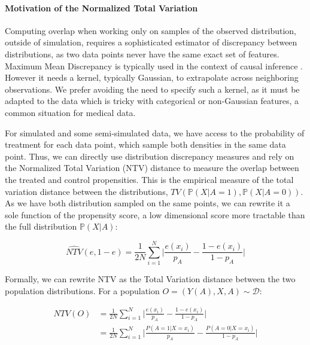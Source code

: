 \documentclass[french,12pt,twoside,a4paper]{book}
\begin{document}
\begin{appendices}
  \paragraph{Motivation of the Normalized Total Variation}
  Computing overlap when working only on samples of the observed distribution,
  outside of simulation, requires a sophisticated estimator of discrepancy
  between distributions, as two data points never have the same exact set of
  features. Maximum Mean Discrepancy \citep{gretton2012kernel} is typically
  used in the context of causal inference
  \citep{shalit_estimating_2017,johansson2022generalization}. However it
  needs a kernel, typically Gaussian, to extrapolate across neighboring
  observations. We prefer avoiding the need to specify such a kernel, as it must
  be adapted to the data which is tricky with categorical or non-Gaussian
  features, a common situation for medical data.

  For simulated and some semi-simulated data, we have access to the probability of
  treatment for each data point, which sample both densities in the same data
  point. Thus, we can directly use distribution discrepancy measures and rely on
  the Normalized Total Variation (NTV) distance to measure the overlap between the
  treated and control propensities. This is the empirical measure of the total
  variation distance \citep{sriperumbudur_integral_2009} between the distributions,
  $TV(\mathbb{P}(X|A=1), \mathbb{P}(X|A=0))$. As we have both distribution sampled
  on the same points, we can rewrite it a sole function of the propensity score, a
  low dimensional score more tractable than the full distribution $\mathbb
    P(X|A)$:

  \begin{equation}\label{eq:ntv}
    \widehat{NTV}(e, 1-e) = \frac{1}{2N} \sum_{i =1}^{N} \big |\frac{e(x_i)}{p_A}-\frac{1-e(x_i)}{1-{p_A}} \big |
  \end{equation}

  Formally, we can rewrite NTV as the Total Variation distance
  between the two population distributions. For a population $O = (Y(A), X, A)
    \sim \mathcal{D}$:

  \begin{align*}
    NTV(O) & = \frac{1}{2N} \sum_{i =1}^{N} \big | \frac{e(x_i)}{p_A}-\frac{1-e(x_i)}{1-{p_A}} \big|         \\
           & = \frac{1}{2N} \sum_{i =1}^{N} \big|\frac{P(A=1|X=x_i)}{p_A}-\frac{P(A=0|X=x_i)}{1-{p_A}} \big|
  \end{align*}


\end{appendices}
\end{document}
